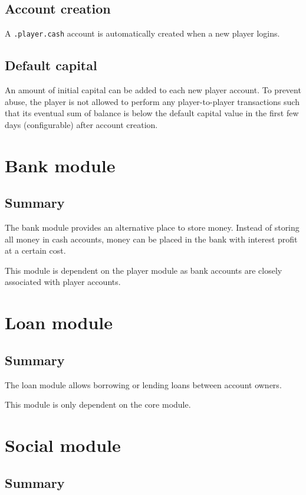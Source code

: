 \documentclass{report}
\begin{document}
		\chapter{Account creation}
			A \texttt{.player.cash} account is automatically created when a new player logins.

			\chapter{Default capital}
				An amount of initial capital can be added to each new player account.
				To prevent abuse, the player is not allowed to perform any player-to-player transactions
				such that its eventual sum of balance is below the default capital value
				in the first few days (configurable) after account creation.

	\part{Bank module}
		\chapter{Summary}

			The bank module provides an alternative place to store money.
			Instead of storing all money in cash accounts, money can be placed in the bank with interest profit at a certain cost.

			This module is dependent on the player module as bank accounts are closely associated with player accounts.

	\part{Loan module}
		\chapter{Summary}

			The loan module allows borrowing or lending loans between account owners.

			This module is only dependent on the core module.

	\part{Social module}
		\chapter{Summary}
\end{document}
